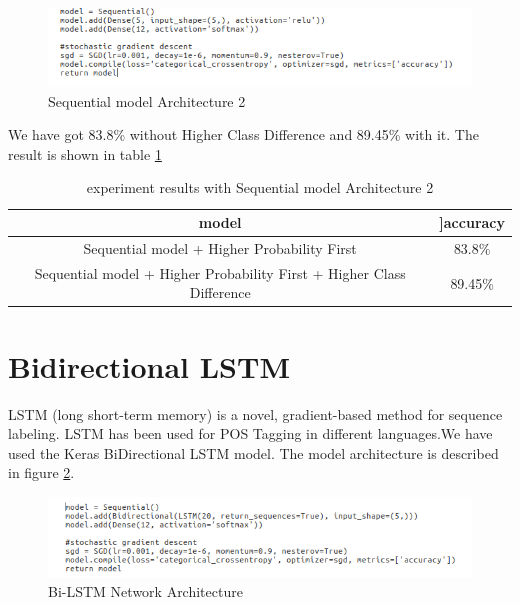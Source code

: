 \documentclass{standalone}
\begin{document}
\begin{itemize}
        \begin{figure}[h!]
        \centering
        \includegraphics[width=1.0\columnwidth]{img/model2.png}
        \caption{Sequential model Architecture 2}
        \label{arc2}
        \end{figure}
        We have got 83.8\% without Higher Class Difference and 89.45\% with it. The result is shown in table \ref{res3}
        \begin{table}[h!]
        \centering
         \begin{tabular}{|c|c|}
            \hline
            \textbf{model} & ]\textbf{accuracy} \\ [1ex]
            \hline
            Sequential model + Higher Probability First & 83.8\%\\
            \hline
            Sequential model + Higher Probability First + Higher Class
            Difference & 89.45\%  \\ 
            \hline
        \end{tabular}
        \caption{experiment results with Sequential model Architecture 2}
        \label{res3}
        \end{table}
\end{itemize}

\section{Bidirectional LSTM}
LSTM (long short-term memory) is a novel, gradient-based method for sequence labeling\cite{doi:10.1162/neco.1997.9.8.1735}. LSTM has been used for POS Tagging in different languages\cite{ma2016endtoend}\cite{huang2015bidirectional}\cite{plank2016multilingual}\cite{wang2015unified}.We have used the Keras BiDirectional LSTM model. The model architecture is described in figure \ref{model3}. 
\begin{figure}[h!]
\centering
\includegraphics[width=1.0\columnwidth]{img/model3.png}
\caption{Bi-LSTM Network Architecture}
\label{model3}
\end{figure}
\end{document}
